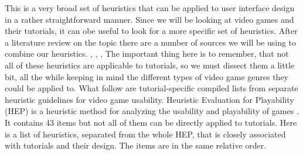 This is a very broad set of heuristics that can be applied to user interface design in a rather straightforward manner. Since we will be looking at video games and their tutorials, it can obe useful to look for a more specific set of heuristics. After a literature review on the topic there are a number of sources we will be using to combine our heuristics. \cite{Desurvire2004}, \cite{Desurvire2009}, \cite{Federoff2002}, \cite{Pinelle2008}
The important thing here is to remember, that not all of these heuristics are applicable to tutorials, so we must dissect them a little bit, all the while keeping in mind the different types of video game genres they could be applied to. What follow are tutorial-specific compiled lists from separate heuristic guidelines for video game usability. Heuristic Evaluation for Playability (HEP) is a heuristic method for analyzing the usability and playability of games \cite{Desurvire2004}. It contains 43 items but not all of them can be directly applied to tutorials. Here is a list of heuristics, separated from the whole HEP, that is closely associated with tutorials and their design. The items are in the same relative order.

